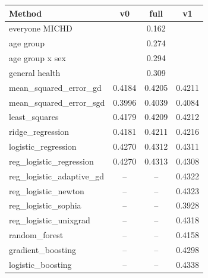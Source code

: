 \begin{tabular}{lccc}
\hline
Method & v0 & full & v1 \\
\hline
everyone MICHD & \multicolumn{3}{c}{0.162} \\
age group & \multicolumn{3}{c}{0.274} \\
age group x sex & \multicolumn{3}{c}{0.294} \\
general health & \multicolumn{3}{c}{0.309} \\
\hline
mean\_squared\_error\_gd & 0.4184 & 0.4205 & 0.4211 \\
mean\_squared\_error\_sgd & 0.3996 & 0.4039 & 0.4084 \\
least\_squares & 0.4179 & 0.4209 & 0.4212 \\
ridge\_regression & 0.4181 & 0.4211 & 0.4216 \\
logistic\_regression & 0.4270 & 0.4312 & 0.4311 \\
reg\_logistic\_regression & 0.4270 & 0.4313 & 0.4308 \\
reg\_logistic\_adaptive\_gd & -- & -- & 0.4322 \\
reg\_logistic\_newton & -- & -- & 0.4323 \\
reg\_logistic\_sophia & -- & -- & 0.3928 \\
reg\_logistic\_unixgrad & -- & -- & 0.4318 \\
random\_forest & -- & -- & 0.4158 \\
gradient\_boosting & -- & -- & 0.4298 \\
logistic\_boosting & -- & -- & 0.4338 \\
\hline
\end{tabular}
